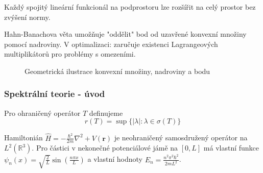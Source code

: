 \begin{theorem}
Každý spojitý lineární funkcionál na podprostoru lze rozšířit na celý prostor bez zvýšení normy.
\end{theorem}

\begin{intuition}
Hahn-Banachova věta umožňuje "oddělit" bod od uzavřené konvexní množiny pomocí nadroviny. V optimalizaci: zaručuje existenci Lagrangeových multiplikátorů pro problémy s omezeními.
\end{intuition}

\begin{figure}[h]
    \centering
    \caption{Geometrická ilustrace konvexní množiny, nadroviny a bodu}
    \label{fig:convex_plane_point}
    \end{figure}

\subsubsection{Spektrální teorie - úvod}

\begin{definition}
Pro ohraničený operátor $T$ definujeme
\[
r(T) = \sup\{|\lambda| : \lambda \in \sigma(T)\}
\]
\end{definition}

\begin{example}
Hamiltonián $\hat{H} = -\frac{\hbar^2}{2m}\nabla^2 + V(\mathbf{r})$ je neohraničený samosdružený operátor na $L^2(\mathbb{R}^3)$. Pro částici v nekonečné potenciálové jámě na $[0,L]$ má vlastní funkce $\psi_n(x) = \sqrt{\frac{2}{L}}\sin(\frac{n\pi x}{L})$ a vlastní hodnoty $E_n = \frac{n^2\pi^2\hbar^2}{2mL^2}$.
\end{example}

